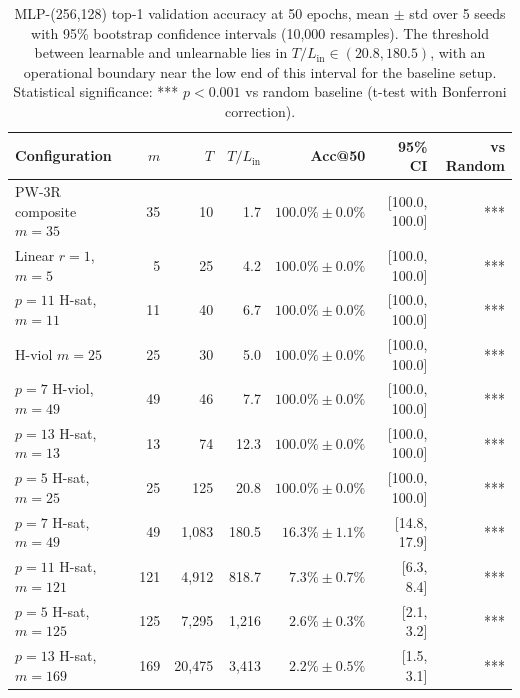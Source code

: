 \documentclass[11pt]{article}
\theoremstyle{plain}
\theoremstyle{definition}
\begin{document}
\begin{table}[ht]
\centering
\caption{MLP-(256,128) top-1 validation accuracy at 50 epochs, mean $\pm$ std over 5 seeds with 95\% bootstrap confidence intervals (10,000 resamples). The threshold between learnable and unlearnable lies in $T/L_{\mathrm{in}} \in (20.8, 180.5)$, with an operational boundary near the low end of this interval for the baseline setup. Statistical significance: *** $p < 0.001$ vs random baseline (t-test with Bonferroni correction).}
\label{tab:neural}
\medskip
\begin{tabular}{@{}lrrrrrr@{}}
\toprule
Configuration & $m$ & $T$ & $T/L_{\mathrm{in}}$ & Acc@50 & 95\% CI & vs Random\\
\midrule
PW-3R composite $m=35$       & 35  & 10           & 1.7    & $100.0\% \pm 0.0\%$ & [100.0, 100.0] & ***\\
Linear $r=1$, $m=5$          & 5   & 25           & 4.2    & $100.0\% \pm 0.0\%$ & [100.0, 100.0] & ***\\
$p=11$ H-sat, $m=11$         & 11  & 40           & 6.7    & $100.0\% \pm 0.0\%$ & [100.0, 100.0] & ***\\
H-viol $m=25$                & 25  & 30           & 5.0    & $100.0\% \pm 0.0\%$ & [100.0, 100.0] & ***\\
$p=7$ H-viol, $m=49$         & 49  & 46           & 7.7    & $100.0\% \pm 0.0\%$ & [100.0, 100.0] & ***\\
$p=13$ H-sat, $m=13$         & 13  & 74           & 12.3   & $100.0\% \pm 0.0\%$ & [100.0, 100.0] & ***\\
$p=5$ H-sat, $m=25$          & 25  & 125          & 20.8   & $100.0\% \pm 0.0\%$ & [100.0, 100.0] & ***\\
\midrule
$p=7$ H-sat, $m=49$          & 49  & 1{,}083       & 180.5  & $16.3\% \pm 1.1\%$  & [14.8, 17.9] & ***\\
$p=11$ H-sat, $m=121$        & 121 & 4{,}912       & 818.7  & $7.3\% \pm 0.7\%$   & [6.3, 8.4] & ***\\
$p=5$ H-sat, $m=125$         & 125 & 7{,}295       & 1{,}216 & $2.6\% \pm 0.3\%$   & [2.1, 3.2] & ***\\
$p=13$ H-sat, $m=169$        & 169 & 20{,}475      & 3{,}413 & $2.2\% \pm 0.5\%$   & [1.5, 3.1] & ***\\
\bottomrule
\end{tabular}
\end{table}
\end{document}
